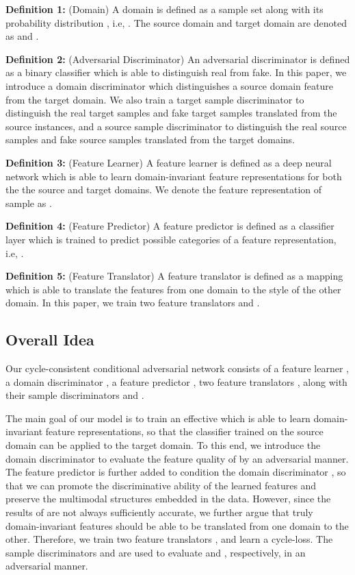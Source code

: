 \documentclass[sigconf]{acmart}
\begin{document}
{\bf Definition 1:} ({Domain}) A domain  is defined as a sample set  along with its probability distribution , i.e, . The source domain and target domain are denoted as  and .

{\bf Definition 2:} (Adversarial Discriminator) An adversarial discriminator  is defined as a binary classifier which is able to distinguish real from fake. In this paper, we introduce a domain discriminator  which distinguishes a source domain feature from the target domain. We also train a target sample discriminator  to distinguish the real target samples and fake target samples translated from the source instances, and a source sample discriminator  to distinguish the real source samples and fake source samples translated from the target domains.

{\bf Definition 3:} (Feature Learner) A feature learner  is defined as a deep neural network which is able to learn domain-invariant feature representations for both the the source and target domains. We denote the feature representation of sample  as .

{\bf Definition 4:} (Feature Predictor) A feature predictor  is defined as a classifier layer which is trained to predict possible categories of a feature representation, i.e, .

{\bf Definition 5:} (Feature Translator) A feature translator  is defined as a mapping which is able to translate the features from one domain to the style of the other domain. In this paper, we train two feature translators  and . 



\subsection{Overall Idea}
Our cycle-consistent conditional adversarial network consists of a feature learner , a domain discriminator , a feature predictor , two feature translators ,  along with their sample discriminators  and . 

The main goal of our model is to train an effective  which is able to learn domain-invariant feature representations, so that the classifier trained on the source domain can be applied to the target domain. To this end, we introduce the domain discriminator  to evaluate the feature quality of  by an adversarial manner. The feature predictor  is further added to condition the domain discriminator , so that we can promote the discriminative ability of the learned features and preserve the multimodal structures embedded in the data. However, since the results of  are not always sufficiently accurate, we further argue that truly domain-invariant features should be able to be translated from one domain to the other. Therefore, we train two feature translators ,  and learn a cycle-loss. The sample discriminators  and  are used to evaluate  and , respectively, in an adversarial manner.
\end{document}
